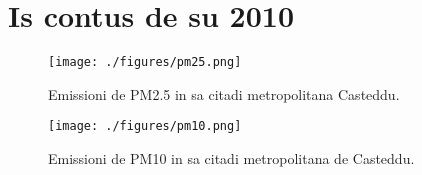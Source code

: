 \documentclass[a4paper]{article}
\begin{document}
\section{Is contus de su 2010}

\begin{figure}[tbp]
    \centering
    \texttt{[image: ./figures/pm25.png]}
    \caption{Emissioni de PM2.5 in sa citadi metropolitana Casteddu.}
    \label{fig:pm25-prov-casteddu}
\end{figure}

\begin{figure}[tbp]
    \centering
    \texttt{[image: ./figures/pm10.png]}
    \caption{Emissioni de PM10 in sa citadi metropolitana  de Casteddu.}
    \label{fig:pm10-prov-casteddu}
\end{figure}

\printbibliography
\end{document}
